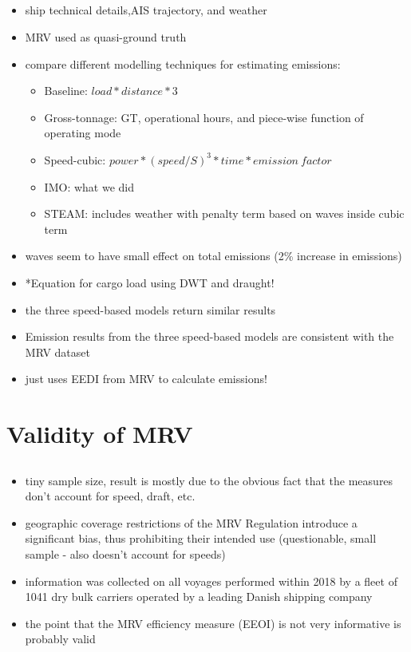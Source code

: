 \documentclass{article}
\newcommand{\paperpath}{../resources/}
\newcommand{\myhref}[2]{\href{run:\paperpath#1}{#2}}
\begin{document}
\subsection{\myhref{Wu et al 2023 - Evaluation of Vessel CO2 Emissions Methods using AIS Trajectories.pdf}{\textcite{wu2023evaluation}}}
\begin{itemize}
    \item ship technical details,AIS trajectory, and weather
    \item MRV used as quasi-ground truth
    \item compare different modelling techniques for estimating emissions:
    \begin{itemize}
        \item Baseline: $load*distance*3$
        \item Gross-tonnage: GT, operational hours, and piece-wise function of operating mode
        \item Speed-cubic: $power*(speed/S)^3*time*emission~factor$
        \item IMO: what we did
        \item STEAM: includes weather with penalty term based on waves inside cubic term
    \end{itemize}
    \item waves seem to have small effect on total emissions (2\% increase in emissions)
    \item *Equation for cargo load using DWT and draught!
    \item the three speed-based models return
    similar results
    \item Emission results from the three speed-based models are consistent with the MRV dataset
    \item just uses EEDI from MRV to calculate emissions!
\end{itemize}

\section{Validity of MRV}
\subsection{\myhref{Panagakos et al 2019 - Monitoring the Carbon Footprint of Dry Bulk Shipping in the EU An Early Assessment of the MRV Regulation.pdf}{\textcite{panagakos2019monitoring}}}
\begin{itemize}
    \item tiny sample size, result is mostly due to the obvious fact that the measures don't account for speed, draft, etc.
    \item geographic coverage restrictions of the MRV Regulation introduce a significant bias, thus prohibiting their intended use (questionable, small sample - also doesn't account for speeds)
    \item information was collected on all voyages
    performed within 2018 by a fleet of 1041 dry bulk carriers operated by a leading Danish shipping
    company
    \item the point that the MRV efficiency measure (EEOI) is not very informative is probably valid
\end{itemize}
\end{document}
